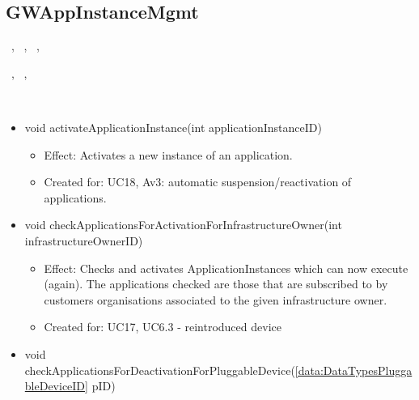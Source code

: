   \subsection{GWAppInstanceMgmt}\label{int:OnlineServiceOnlineServiceApplicationManagerApplicationManagementLogicGWAppInstanceMgmt}
    \begin{description}
      \item[Provided by:] \iconcomponent{}~, \iconcomponent{}~, \iconcomponent{}~, \iconcomponent{}~
      \item[Required by:] \iconcomponent{}~, \iconcomponent{}~, \iconcomponent{}~
      \item[Operations:] ~
    \begin{itemize}[noitemsep,nolistsep,leftmargin=-.25cm]
      \item \textsf{void activateApplicationInstance(int applicationInstanceID)}
        \begin{itemize}[noitemsep,nolistsep]
           \item Effect: Activates a new instance of an application.
\item Created for: UC18, Av3: automatic suspension/reactivation of applications.
        \end{itemize}
      \item \textsf{void checkApplicationsForActivationForInfrastructureOwner(int infrastructureOwnerID)}
        \begin{itemize}[noitemsep,nolistsep]
           \item Effect: Checks and activates ApplicationInstances which can now execute (again). The applications checked are those that are subscribed to by customers organisations associated to the given infrastructure owner.
\item Created for: UC17, UC6.3 - reintroduced device
        \end{itemize}
      \item \textsf{void checkApplicationsForDeactivationForPluggableDevice(\ref{data:DataTypesPluggableDeviceID} pID)}
        \begin{itemize}

\end{itemize}
\end{itemize}
\end{description}
